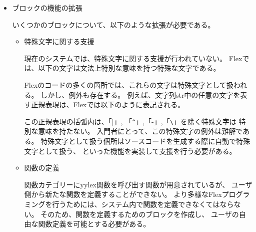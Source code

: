 \documentclass{risepaper}
\begin{document}
\begin{itemize}
\item ブロックの機能の拡張

いくつかのブロックについて、以下のような拡張が必要である。

\begin{itemize}
\item 特殊文字に関する支援

現在のシステムでは、特殊文字に関する支援が行われていない。
Flexでは、以下の文字は文法上特別な意味を持つ特殊な文字である。


Flexのコードの多くの箇所では、これらの文字は特殊文字として扱われる。
しかし、例外も存在する。
例えば、文字列str中の任意の文字を表す正規表現は、Flexでは以下のように表記される。

\shadowbox{
\begin{minipage}[t]{4cm}
\begin{verbatim}
[str]
\end{verbatim}
\end{minipage}
}

この正規表現の括弧内は、「]」, 「\verb|^|」,「-」,「\verb|\|」を除く特殊文字は
特別な意味を持たない。
入門者にとって、この特殊文字の例外は難解である。
特殊文字として扱う個所はソースコードを生成する際に自動で特殊文字として扱う、
といった機能を実装して支援を行う必要がある。

\end{itemize}

\begin{itemize}
\item 関数の定義

関数カテゴリーにyylex関数を呼び出す関数が用意されているが、
ユーザ側から新たな関数を定義することができない。
より多様なFlexプログラミングを行うためには、システム内で関数を定義できなくてはならない。
そのため、関数を定義するためのブロックを作成し、
ユーザの自由な関数定義を可能とする必要がある。

\end{itemize}

\end{itemize}
\end{document}
